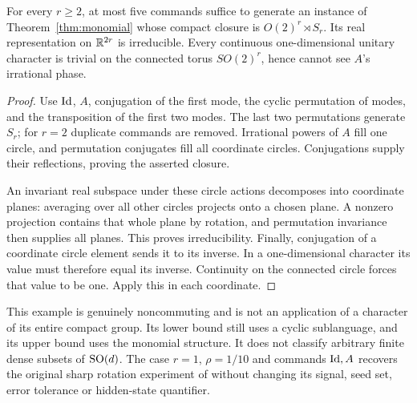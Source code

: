 \begin{proposition}
\label{prop:no-character}
For every $r\ge2$, at most five commands suffice to generate an instance
of Theorem~\ref{thm:monomial} whose compact closure is
$O(2)^r\rtimes S_r$. Its real representation on $\mathbb R^{2r}$ is irreducible.
Every continuous one-dimensional unitary character is trivial on the
connected torus $SO(2)^r$, hence cannot see $A$'s irrational phase.
\end{proposition}
\begin{proof}
Use $\operatorname{Id}$, $A$, conjugation of the first mode, the cyclic permutation
of modes, and the transposition of the first two modes. The last two
permutations generate $S_r$; for $r=2$ duplicate commands are removed.
Irrational powers of $A$ fill one circle, and permutation conjugates
fill all coordinate circles. Conjugations supply their reflections,
proving the asserted closure.

An invariant real subspace under these circle actions decomposes into
coordinate planes: averaging over all other circles projects onto a
chosen plane. A nonzero projection contains that whole plane by rotation,
and permutation invariance then supplies all planes. This proves
irreducibility. Finally, conjugation of a coordinate circle element
sends it to its inverse. In a one-dimensional character its value must
therefore equal its inverse. Continuity on the connected circle forces
that value to be one. Apply this in each coordinate.
\end{proof}

This example is genuinely noncommuting and is not an application of a
character of its entire compact group. Its lower bound still uses a
cyclic sublanguage, and its upper bound uses the monomial structure.
It does not classify arbitrary finite dense subsets of $\operatorname{SO}(d)$.
The case $r=1$, $\rho=1/10$ and commands $\operatorname{Id},A$ recovers the original
sharp rotation experiment of \cite{GTF35} without changing its signal,
seed set, error tolerance or hidden-state quantifier.
